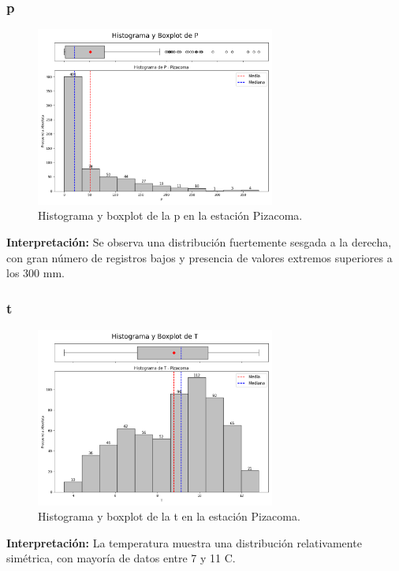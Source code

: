 \subsubsection*{\gls{p} }
\begin{figure}[htbp]
\centering
\includegraphics[width=0.7\textwidth]{resultados/por_estacion_meteorologica/Pizacoma/P_histograma.png}
\caption{Histograma y boxplot de la \gls{p}  en la estación Pizacoma.}
\label{fig:pizacoma_P}
\end{figure}
\textbf{Interpretación:} Se observa una distribución fuertemente sesgada a la derecha, con gran número de registros bajos y presencia de valores extremos superiores a los 300 mm.

\subsubsection*{\gls{t} }
\begin{figure}[htbp]
\centering
\includegraphics[width=0.7\textwidth]{resultados/por_estacion_meteorologica/Pizacoma/T_histograma.png}
\caption{Histograma y boxplot de la \gls{t}  en la estación Pizacoma.}
\label{fig:pizacoma_T}
\end{figure}
\textbf{Interpretación:} La temperatura muestra una distribución relativamente simétrica, con mayoría de datos entre 7 y 11 \textdegree C.

